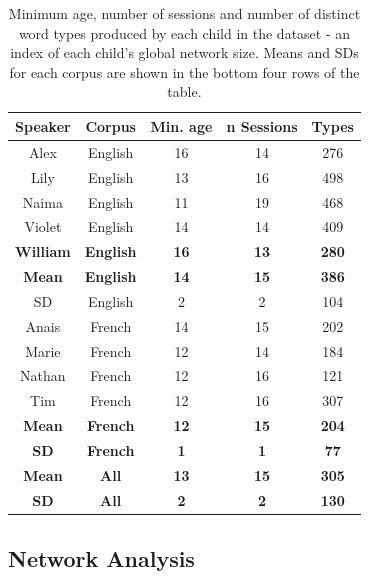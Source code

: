 \documentclass[
  english,
  man,floatsintext]{apa6}
\begin{document}
\begin{longtable}[t]{ccccc}
\caption{\label{tab:table-data-overview}Minimum age, number of sessions and number of distinct word types produced by each child in the dataset - an index of each child's global network size. Means and SDs for each corpus are shown in the bottom four rows of the table.}\\
\toprule
Speaker & Corpus & Min. age & n Sessions & Types\\
\midrule
Alex & English & 16 & 14 & 276\\
Lily & English & 13 & 16 & 498\\
Naima & English & 11 & 19 & 468\\
Violet & English & 14 & 14 & 409\\
\midrule
\textbf{William} & \textbf{English} & \textbf{16} & \textbf{13} & \textbf{280}\\
\addlinespace
\textbf{Mean} & \textbf{English} & \textbf{14} & \textbf{15} & \textbf{386}\\
\midrule
SD & English & 2 & 2 & 104\\
Anais & French & 14 & 15 & 202\\
Marie & French & 12 & 14 & 184\\
Nathan & French & 12 & 16 & 121\\
\addlinespace
Tim & French & 12 & 16 & 307\\
\midrule
\textbf{Mean} & \textbf{French} & \textbf{12} & \textbf{15} & \textbf{204}\\
\textbf{SD} & \textbf{French} & \textbf{1} & \textbf{1} & \textbf{77}\\
\midrule
\textbf{Mean} & \textbf{All} & \textbf{13} & \textbf{15} & \textbf{305}\\
\textbf{SD} & \textbf{All} & \textbf{2} & \textbf{2} & \textbf{130}\\
\bottomrule
\end{longtable}

\hypertarget{network-analysis}{%
\subsection{Network Analysis}\label{network-analysis}}
\end{document}
